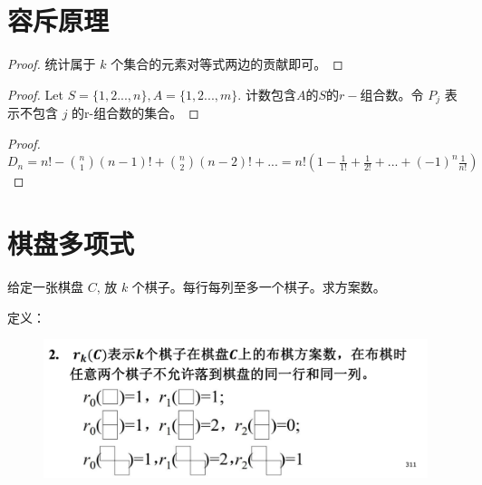 \documentclass[oneside]{book}
\begin{document}
\section{容斥原理}



\begin{proof}
    统计属于 $k$ 个集合的元素对等式两边的贡献即可。
\end{proof}


\begin{proof}
    Let $S = \{1,2...,n\}, A = \{1,2...,m\}$. 计数包含$A$的$S$的$r-$组合数。令 $P_j$ 表示不包含 $j$ 的r-组合数的集合。
\end{proof}

\begin{proof}
    $D_n = n! - \binom{n}{1}(n-1)! + \binom{n}{2}(n-2)! + ... = n!(1 - \frac 1{1!} + \frac 1{2!} + ... + (-1)^{n}\frac 1 {n!})$
\end{proof}

\section{棋盘多项式}

给定一张棋盘 $C$, 放 $k$ 个棋子。每行每列至多一个棋子。求方案数。

定义：

\begin{figure}[H]
    \center
    \includegraphics[scale=0.4]{img/chess1.png}
\end{figure}
\end{document}
